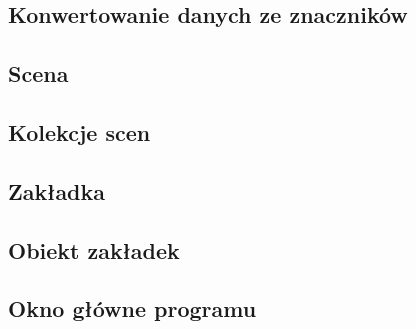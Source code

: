 
\subsection{Konwertowanie danych ze znaczników}


\subsection{Scena}


\subsection{Kolekcje scen}


\subsection{Zakładka}


\subsection{Obiekt zakładek}


\subsection{Okno główne programu}

